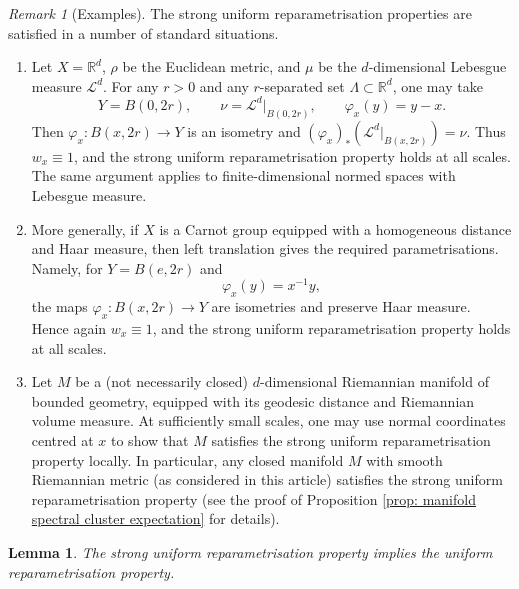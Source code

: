 \documentclass[12pt,reqno]{amsart}
\newtheorem{lemma}[theorem]{Lemma}
\theoremstyle{definition}
\theoremstyle{remark}
\newtheorem{remark}[theorem]{Remark}
\numberwithin{equation}{section}
\newcommand{\1}{\mathbbm{1}}
\renewcommand{\phi}{\varphi}
\begin{document}
\begin{remark}[Examples]\label{rem:examples reparametrisation}
The strong uniform reparametrisation properties are satisfied in a number of
standard situations.

\begin{enumerate}
    \item Let \(X=\mathbb R^d\), $\rho$ be the Euclidean metric, and $\mu$ be the $d$-dimensional Lebesgue
    measure \(\mathcal L^d\). For any \(r>0\) and any \(r\)-separated set
    \(\Lambda\subset\mathbb R^d\), one may take
    \[
        Y=B(0,2r),\qquad \nu=\mathcal L^d|_{B(0,2r)},
        \qquad \phi_x(y)=y-x .
    \]
    Then \(\phi_x:B(x,2r)\to Y\) is an isometry and
    \((\phi_x)_*(\mathcal L^d|_{B(x,2r)})=\nu\). Thus \(w_x\equiv 1\),
    and the strong uniform reparametrisation property holds at all
    scales. The same argument applies to finite-dimensional normed
    spaces with Lebesgue measure.

    \item More generally, if \(X\) is a Carnot group equipped with a
    homogeneous distance and Haar measure, then left translation gives
    the required parametrisations. Namely, for \(Y=B(e,2r)\) and
    \[
        \phi_x(y)=x^{-1}y ,
    \]
    the maps \(\phi_x:B(x,2r)\to Y\) are isometries and preserve Haar
    measure. Hence again \(w_x\equiv 1\), and the strong uniform reparametrisation property holds at all scales.

    \item Let \(M\) be a (not necessarily closed) \(d\)-dimensional Riemannian manifold of
    bounded geometry, equipped with its geodesic distance and Riemannian
    volume measure. At sufficiently small scales, one may use normal
    coordinates centred at \(x\) to show that \(M\) satisfies the strong uniform reparametrisation property locally. In particular, any closed manifold \(M\) with smooth Riemannian metric (as considered in this article) satisfies the strong uniform reparametrisation property (see the proof of Proposition \ref{prop: manifold spectral cluster expectation} for details).

    
\end{enumerate}
\end{remark}

\begin{lemma}\label{lemma uniform bilipschitz}
The strong uniform reparametrisation property implies the uniform reparametrisation property.
\end{lemma}
\end{document}
